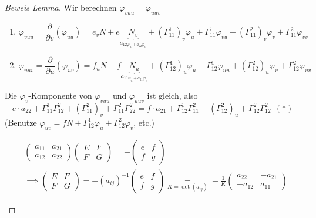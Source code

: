 \documentclass[../main.tex]{subfiles}
\begin{document}
\begin{proof}[Beweis Lemma]
    Wir berechnen $\varphi_{vuu}=\varphi_{uuv}$ \begin{enumerate}
        \item $$\varphi_{vuu} = \frac{\partial}{\partial v}(\varphi_{uu}) = e_{v}N+e\underbrace{N_{v}}_{a_{12\varphi_{u}+a_{22}\varphi_{v}}}+(\Gamma_{11}^{1})_{v}\varphi_{u}+\Gamma_{11}^{1}\varphi_{vu}+(\Gamma_{11}^{2})_{v}\varphi_{v}+\Gamma_{11}^{2}\varphi_{vv}$$
        \item $$\varphi_{uuv} = \frac{\partial}{\partial u}(\varphi_{uv}) = f_{u}N+f\underbrace{N_{u}}_{a_{11\varphi_{u}+a_{21}\varphi_{v}}}+(\Gamma_{12}^{1})_{u}\varphi_{u}+\Gamma_{12}^{1}\varphi_{uu}+(\Gamma_{12}^{2})_{u}\varphi_{v}+\Gamma_{12}^{2}\varphi_{uv}$$
    \end{enumerate}
    Die $\varphi_{v}$-Komponente von $\varphi_{vuu}$ und $\varphi_{uuv}$ ist gleich, also 
    $$e\cdot a_{22}+\Gamma_{11}^{1}\Gamma_{12}^{2}+(\Gamma_{11}^{2})_{v}+\Gamma_{11}^{2}\Gamma_{22}^{2} = f\cdot a_{21}+\Gamma_{12}^{1}\Gamma_{11}^{2}+(\Gamma_{12}^{2})_{u}+\Gamma_{12}^{2}\Gamma_{12}^{2} \ \ (*)$$
    (Benutze $\varphi_{uv} = fN+\Gamma_{12}^{1}\varphi_{u}+\Gamma_{12}^{2}\varphi_{v}$, etc.)
    \begin{recall}
        \begin{align*}
            &\begin{pmatrix}
                a_{11}&a_{21}\\a_{12}&a_{22}
            \end{pmatrix} \begin{pmatrix}
                E&F\\F&G
            \end{pmatrix} = -\begin{pmatrix}
                e&f\\f&g
            \end{pmatrix}\\
            &\implies \begin{pmatrix}
                E&F\\F&G
            \end{pmatrix} = -(a_{ij})^{-1}\begin{pmatrix}
                e&f\\f&g
            \end{pmatrix} \underset{K = \det(a_{ij})}{=} -\frac{1}{K}\begin{pmatrix}
                a_{22}&-a_{21}\\-a_{12}&a_{11}

\end{pmatrix}
\end{align*}
\end{recall}
\end{proof}
\end{document}
